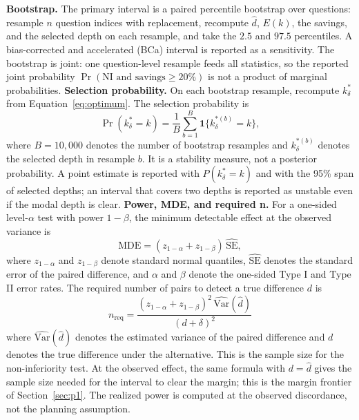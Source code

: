 \documentclass[a4paper,fleqn]{cas-sc}
\begin{document}
\textbf{Bootstrap.} The primary interval is a paired percentile bootstrap over questions: resample $n$ question indices with replacement, recompute $\hat d$, $E(k)$, the savings, and the selected depth on each resample, and take the $2.5$ and $97.5$ percentiles. A bias-corrected and accelerated (BCa) interval is reported as a sensitivity. The bootstrap is joint: one question-level resample feeds all statistics, so the reported joint probability $\Pr(\text{NI and savings}\ge20\%)$ is not a product of marginal probabilities. \textbf{Selection probability.} On each bootstrap resample, recompute $k^{*}_{\delta}$ from Equation~\eqref{eq:optimum}. The selection probability is
\begin{equation}\label{eq:selection}
  \Pr(k^{*}_{\delta}=k)=\frac{1}{B}\sum_{b=1}^{B}\mathbf{1}\{k^{*(b)}_{\delta}=k\},
\end{equation}
where $B=10{,}000$ denotes the number of bootstrap resamples and $k^{*(b)}_{\delta}$ denotes the selected depth in resample $b$. It is a stability measure, not a posterior probability. A point estimate is reported with $P(k^{*}_{\delta}=k)$ and with the 95\% span of selected depths; an interval that covers two depths is reported as unstable even if the modal depth is clear. \textbf{Power, MDE, and required n.} For a one-sided level-$\alpha$ test with power $1-\beta$, the minimum detectable effect at the observed variance is
\begin{equation}\label{eq:mde}
  \mathrm{MDE}=(z_{1-\alpha}+z_{1-\beta})\,\widehat{\mathrm{SE}},
\end{equation}
where $z_{1-\alpha}$ and $z_{1-\beta}$ denote standard normal quantiles, $\widehat{\mathrm{SE}}$ denotes the standard error of the paired difference, and $\alpha$ and $\beta$ denote the one-sided Type I and Type II error rates. The required number of pairs to detect a true difference $d$ is
\begin{equation}\label{eq:required-n}
  n_{\mathrm{req}}=\frac{(z_{1-\alpha}+z_{1-\beta})^{2}\,\widehat{\mathrm{Var}}(\hat d)}{(d+\delta)^{2}}
\end{equation}
where $\widehat{\mathrm{Var}}(\hat d)$ denotes the estimated variance of the paired difference and $d$ denotes the true difference under the alternative. This is the sample size for the non-inferiority test. At the observed effect, the same formula with $d=\hat d$ gives the sample size needed for the interval to clear the margin; this is the margin frontier of Section~\ref{sec:p1}. The realized power is computed at the observed discordance, not the planning assumption.
\end{document}
